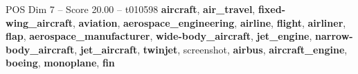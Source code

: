 \begin{textsample}{POS Dim 7 – Score 20.00 – t010598}  \label{ex:f7_pos_017}
\textbf{aircraft}, \textbf{air\_travel}, \textbf{fixed-wing\_aircraft}, \textbf{aviation}, \textbf{aerospace\_engineering}, \textbf{airline}, \textbf{flight}, \textbf{airliner}, \textbf{flap}, \textbf{aerospace\_manufacturer}, \textbf{wide-body\_aircraft}, \textbf{jet\_engine}, \textbf{narrow-body\_aircraft}, \textbf{jet\_aircraft}, \textbf{twinjet}, screenshot, \textbf{airbus}, \textbf{aircraft\_engine}, \textbf{boeing}, \textbf{monoplane}, \textbf{fin}

\end{textsample}
